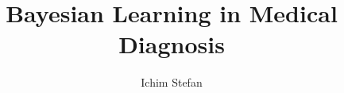 \documentclass[3p,times,procedia]{elsarticle}
\begin{document}
\begin{frontmatter}



%


\title{\textbf{Bayesian Learning in Medical Diagnosis}}




\author{Ichim Stefan} 

\address{Department of Computer Science, Babe\c s-Bolyai University\\1, M. Kogalniceanu Street, 400084, Cluj-Napoca, Romania\\E-mail: stefan.ichim@stud.ubbcluj.ro}

\begin{abstract}

\end{abstract}

\begin{keyword}




\end{keyword}
\end{frontmatter}
\end{document}
